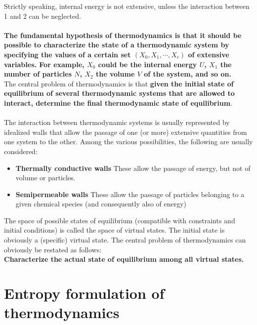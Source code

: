Strictly speaking, internal energy is not extensive, unless the interaction between 1 and 2 can be neglected.
\\ \\
\textbf{The fundamental hypothesis of thermodynamics is that it should be possible to characterize the state of a thermodynamic system by specifying the values of a certain set $(X_0, X_1, \cdots, X_r)$ of extensive variables. For example, $X_0$ could be the internal energy $U$, $X_1$ the number of particles $N$, $X_2$ the volume $V$ of the system, and so on.}
\\
The central problem of thermodynamics is that \textbf{given the initial state of equilibrium of several thermodynamic systems that are allowed to interact, determine the final thermodynamic state of equilibrium}.
\\ \\
The interaction between thermodynamic systems is usually represented by idealized walls that allow the passage of one (or more) extensive quantities from one system to the other.
Among the various possibilities, the following are usually considered:
\begin{itemize}
\item \textbf{Thermally conductive walls} These allow the passage of energy, but not of volume or particles. 
\item \textbf{ Semipermeable walls} These allow the passage of particles belonging to a given chemical species (and consequently also of energy)
\end{itemize}
The space of possible states of equilibrium (compatible with constraints and initial conditions) is called the space of virtual states. The initial state is obviously a (specific) virtual state. The central problem of thermodynamics can obviously be restated as follows:
\\
\textbf{Characterize the actual state of equilibrium among all virtual states.}

\section{Entropy formulation of thermodynamics}
